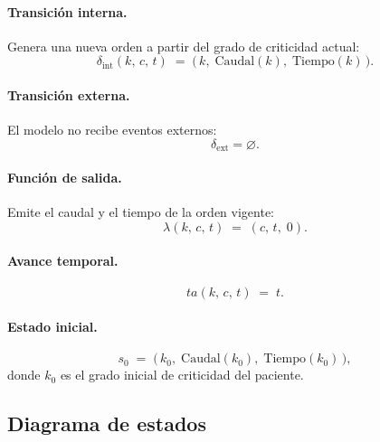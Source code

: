 \documentclass{article}
\newcommand{\dint}{\delta_{\mathrm{int}}}
\newcommand{\dext}{\delta_{\mathrm{ext}}}
\newcommand{\ta}{\mathit{ta}}
\begin{document}
\paragraph{Transición interna.}
Genera una nueva orden a partir del grado de criticidad actual:
\[
  \dint(k,\,c,\,t)
  \;=\;
  \bigl(\,k,\;\mathrm{Caudal}(k),\;\mathrm{Tiempo}(k)\,\bigr).
\]

\paragraph{Transición externa.}
El modelo no recibe eventos externos:
\[
  \dext = \varnothing.
\]

\paragraph{Función de salida.}
Emite el caudal y el tiempo de la orden vigente:
\[
  \lambda(k,\,c,\,t) \;=\; (c,\,t,\;0).
\]

\paragraph{Avance temporal.}
\[
  \ta(k,\,c,\,t) \;=\; t.
\]

\paragraph{Estado inicial.}
\[
  s_0 \;=\; \bigl(\,k_0,\;\mathrm{Caudal}(k_0),\;\mathrm{Tiempo}(k_0)\,\bigr),
\]
donde $k_0$ es el grado inicial de criticidad del paciente.

\subsection{Diagrama de estados}

\begin{center}
\end{center}
\end{document}
